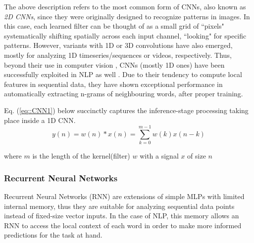 \documentclass[preprint,review,12pt]{elsarticle}
\begin{document}
The above description refers to the most common form of CNNs, also known as \textit{2D CNNs}, since they were originally designed to recognize patterns in images. In this case, each learned filter can be thought of as a small grid of ``pixels" systematically shifting spatially across each input channel, ``looking" for specific patterns. However, variants with 1D or 3D convolutions have also emerged, mostly for analyzing 1D timeseries/sequences or videos, respectively. Thus, beyond their use in computer vision \cite{scuttle} \cite{yang} \cite{patrick}, CNNs (mostly 1D ones) have been successfully exploited in NLP as well \cite{dauphin}. Due to their tendency to compute local features in sequential data, they have shown exceptional performance in automatically extracting n-grams of neighbouring words, after proper training.

Eq. (\ref{eq::CNN1}) below succinctly captures the inference-stage processing taking place inside a 1D CNN.
\begin{equation}
    {y(n)}=  {w}(n) * {x}(n) = \sum_{k=0}^{m-1} {w}(k) {x}(n -k)
\label{eq::CNN1}
\end{equation}

\noindent where $m$ is the length of the kernel(filter) $w$ with a signal $x$ of size $n$

\subsubsection{Recurrent Neural Networks}
Recurrent Neural Networks (RNN) are extensions of simple MLPs with limited internal memory, thus they are suitable for analyzing sequential data points instead of fixed-size vector inputs. In the case of NLP, this memory allows an RNN to access the local context of each word in order to make more informed predictions for the task at hand.
\end{document}
